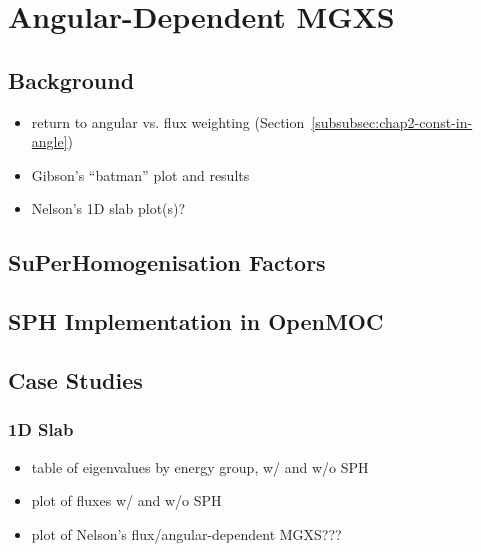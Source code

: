 \chapter{Angular-Dependent MGXS}
\label{chap:sph}


\section{Background}
\label{sec:chap5-background}

\begin{itemize}[noitemsep]
  \item return to angular vs. flux weighting (Section~\ref{subsubsec:chap2-const-in-angle})
  \item Gibson's ``batman'' plot and results
  \item Nelson's 1D slab plot(s)?
\end{itemize}


\section{SuPerHomogenisation Factors}
\label{sec:chap5-sph}


\section{SPH Implementation in OpenMOC}
\label{sec:chap5-sph-openmoc}


\section{Case Studies}
\label{sec:chap5-sph-results}

\subsection{1D Slab}
\label{subsubsec:chap5-sph-slab}

\begin{itemize}[noitemsep]
  \item table of eigenvalues by energy group, w/ and w/o SPH
  \item plot of fluxes w/ and w/o SPH
  \item plot of Nelson's flux/angular-dependent MGXS???
\end{itemize}

